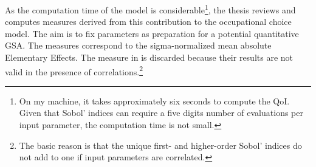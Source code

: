 \documentclass[a4paper,12pt]{article}
\begin{document}
\noindent
As the computation time of the \cite{Keane.1994} model is considerable\footnote{On my machine, it takes approximately six seconds to compute the QoI. Given that Sobol' indices can require a five digits number of evaluations per input parameter, the computation time is not small.}, the thesis reviews \cite{ge2017extending} and computes measures derived from this contribution to the occupational choice model. The aim is to fix parameters as preparation for a potential quantitative GSA. The measures correspond to the sigma-normalized mean absolute Elementary Effects. The measure in \citeauthor{kucherenko2009derivative} is discarded because their results are not valid in the presence of correlations.\footnote{The basic reason is that the unique first- and higher-order Sobol' indices do not add to one if input parameters are correlated.}


\newpage

\end{document}
